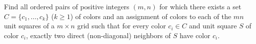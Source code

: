 Find all ordered pairs of positive integers $(m,n)$ for which there exists a set $C=\{c_1,\ldots,c_k\}$ ($k\ge1$) of colors and an assignment of colors to each of the $mn$ unit squares of a $m\times n$ grid such that for every color $c_i\in C$ and unit square $S$ of color $c_i$, exactly two direct (non-diagonal) neighbors of $S$ have color $c_i$.